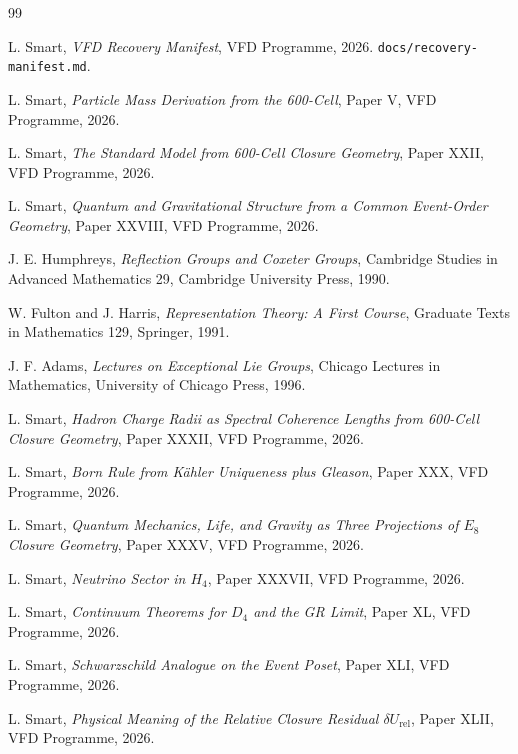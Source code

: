 \documentclass[12pt]{article}
\theoremstyle{definition}
\theoremstyle{remark}
\begin{document}

\begin{thebibliography}{99}

 L. Smart, \emph{VFD Recovery Manifest}, VFD Programme, 2026. \texttt{docs/recovery-manifest.md}.

 L. Smart, \emph{Particle Mass Derivation from the 600-Cell}, Paper V, VFD Programme, 2026.

 L. Smart, \emph{The Standard Model from 600-Cell Closure Geometry}, Paper XXII, VFD Programme, 2026.

 L. Smart, \emph{Quantum and Gravitational Structure from a Common Event-Order Geometry}, Paper XXVIII, VFD Programme, 2026.

 J. E. Humphreys, \emph{Reflection Groups and Coxeter Groups}, Cambridge Studies in Advanced Mathematics 29, Cambridge University Press, 1990.

 W. Fulton and J. Harris, \emph{Representation Theory: A First Course}, Graduate Texts in Mathematics 129, Springer, 1991.

 J. F. Adams, \emph{Lectures on Exceptional Lie Groups}, Chicago Lectures in Mathematics, University of Chicago Press, 1996.

 L. Smart, \emph{Hadron Charge Radii as Spectral Coherence Lengths from 600-Cell Closure Geometry}, Paper XXXII, VFD Programme, 2026.

 L. Smart, \emph{Born Rule from K\"ahler Uniqueness plus Gleason}, Paper XXX, VFD Programme, 2026.

 L. Smart, \emph{Quantum Mechanics, Life, and Gravity as Three Projections of $E_8$ Closure Geometry}, Paper XXXV, VFD Programme, 2026.

 L. Smart, \emph{Neutrino Sector in $H_4$}, Paper XXXVII, VFD Programme, 2026.

 L. Smart, \emph{Continuum Theorems for $D_4$ and the GR Limit}, Paper XL, VFD Programme, 2026.

 L. Smart, \emph{Schwarzschild Analogue on the Event Poset}, Paper XLI, VFD Programme, 2026.

 L. Smart, \emph{Physical Meaning of the Relative Closure Residual $\delta U_{\mathrm{rel}}$}, Paper XLII, VFD Programme, 2026.


\end{thebibliography}
\end{document}
